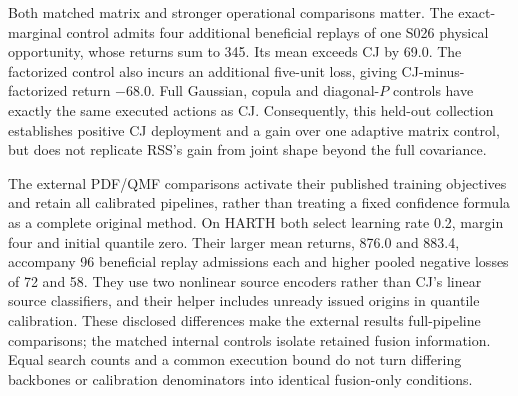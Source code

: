 \documentclass[10pt]{article}
\begin{document}
\begin{table}[t]
\centering\small
\caption{Exact pooled CJ-minus-control action return on HARTH.
The first four numerical columns are nonnegative return magnitudes.
Their signed sum divided by five gives the final mean difference.
Methods sharing every CJ action are grouped only in this decomposition.}
\label{tab:harth-changed-actions}
\end{table}

Both matched matrix and stronger operational comparisons matter.
The exact-marginal control admits four additional beneficial replays of
one S026 physical opportunity, whose returns sum to 345. Its mean exceeds
CJ by 69.0. The factorized control also incurs an additional five-unit
loss, giving CJ-minus-factorized return $-68.0$. Full Gaussian, copula
and diagonal-$P$ controls have exactly the same executed actions as CJ.
Consequently, this held-out collection establishes positive CJ deployment
and a gain over one adaptive matrix control, but does not replicate RSS's
gain from joint shape beyond the full covariance.

The external PDF/QMF comparisons activate their published training
objectives and retain all calibrated pipelines, rather than treating a
fixed confidence formula as a complete original method. On HARTH both
select learning rate 0.2, margin four and initial quantile zero.
Their larger mean returns, 876.0 and 883.4, accompany 96 beneficial
replay admissions each and higher pooled negative losses of 72 and 58.
They use two nonlinear source encoders rather than CJ's linear source
classifiers, and their helper includes unready issued origins in quantile
calibration. These disclosed differences make the external results
full-pipeline comparisons; the matched internal controls isolate retained
fusion information. Equal search counts and a common execution bound do
not turn differing backbones or calibration denominators into identical
fusion-only conditions.
\end{document}
